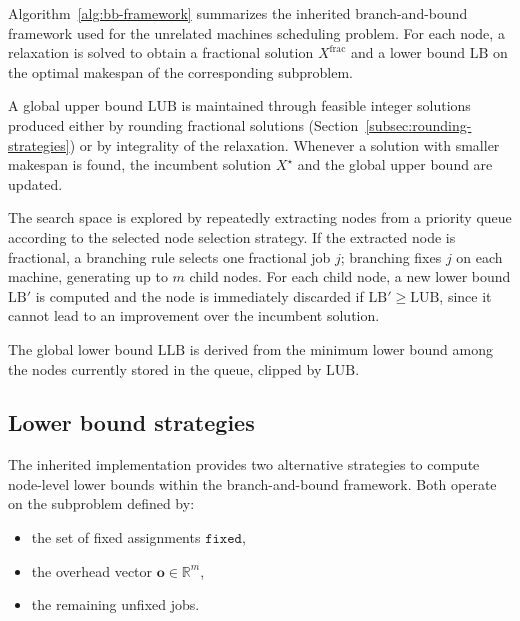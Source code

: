 Algorithm~\ref{alg:bb-framework} summarizes the inherited branch-and-bound framework used for the unrelated machines scheduling problem.
For each node, a relaxation is solved to obtain a fractional solution \(X^{\text{frac}}\) and a lower bound \(\text{LB}\) on the optimal makespan of the corresponding subproblem.

A global upper bound \(\text{LUB}\) is maintained through feasible integer solutions produced either by rounding fractional solutions (Section~\ref{subsec:rounding-strategies}) or by integrality of the relaxation.
Whenever a solution with smaller makespan is found, the incumbent solution \(X^{\star}\) and the global upper bound are updated.

The search space is explored by repeatedly extracting nodes from a priority queue according to the selected node selection strategy.
If the extracted node is fractional, a branching rule selects one fractional job \(j\); branching fixes \(j\) on each machine, generating up to \(m\) child nodes.
For each child node, a new lower bound \(\text{LB}'\) is computed and the node is immediately discarded if \(\text{LB}' \ge \text{LUB}\), since it cannot lead to an improvement over the incumbent solution.

The global lower bound \(\text{LLB}\) is derived from the minimum lower bound among the nodes currently stored in the queue, clipped by \(\text{LUB}\).

\subsection{Lower bound strategies}
\label{subsec:lower-bounds}

The inherited implementation provides two alternative strategies to compute node-level lower bounds within the branch-and-bound framework.
Both operate on the subproblem defined by:
\begin{itemize}
  \item the set of fixed assignments \(\texttt{fixed}\),
  \item the overhead vector $\mathbf{o} \in \mathbb{R}^m$,
  \item the remaining unfixed jobs.
\end{itemize}

